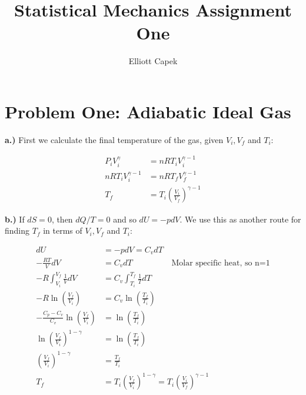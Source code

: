 \documentclass[10pt]{article} %
\title{Statistical Mechanics Assignment One}
\author{Elliott Capek}
\begin{document}
\maketitle{}

\section{Problem One: Adiabatic Ideal Gas}
\textbf{a.)}
First we calculate the final temperature of the gas, given $V_i, V_f$ and $T_i$:

\begin{align*}
  P_iV_i^\gamma &= nRT_iV_i^{\gamma-1}\\
  nRT_iV_i^{\gamma-1} &= nRT_fV_f^{\gamma-1}\\
  T_f &= T_i\left(\frac{V_i}{V_f}\right)^{\gamma-1}
\end{align*}

\textbf{b.)}
If $dS=0$, then $dQ/T=0$ and so $dU = -pdV$. We use this as another route for finding $T_f$ in
terms of $V_i, V_f$ and $T_i$:

\begin{align*}
  dU &= -pdV = C_vdT\\
  -\frac{RT}{V}dV &= C_vdT \hspace{2cm}\mbox{Molar specific heat, so n=1}\\
  -R\int_{V_i}^{V_f}\frac{1}{V}dV &= C_v\int_{T_i}^{T_f}\frac{1}{T}dT\\
  -R\ln\left(\frac{V_f}{V_i}\right) &= C_v\ln\left(\frac{T_f}{T_i}\right)\\
  -\frac{C_p-C_v}{C_v}\ln\left(\frac{V_f}{V_i}\right) &= \ln\left(\frac{T_f}{T_i}\right)\\
  \ln\left(\frac{V_f}{V_i}\right)^{1-\gamma} &= \ln\left(\frac{T_f}{T_i}\right)\\
  \left(\frac{V_f}{V_i}\right)^{1-\gamma} &= \frac{T_f}{T_i}\\
  T_f &= T_i\left(\frac{V_f}{V_i}\right)^{1-\gamma} = T_i\left(\frac{V_i}{V_f}\right)^{\gamma-1}\\
\end{align*}
\end{document}
